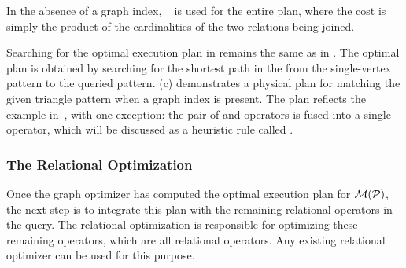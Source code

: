 In the absence of a graph index, \hashjoin~ is used for the entire plan, where the cost is simply the product of the cardinalities of the two relations being joined.


 Searching for the optimal execution plan in \name remains the same as in \glogs. The optimal plan is obtained by searching for the shortest path in the \glogue from the single-vertex pattern to the queried pattern.  %
(c) demonstrates a physical plan for matching the given triangle pattern when a graph index is present. The plan reflects the example in~, with one exception: the pair of \expandedge and \getvertex operators is fused into a single \expand operator, which will be discussed as a heuristic rule called \joinfuserule.


\subsubsection{The Relational Optimization}
Once the graph optimizer has computed the optimal execution plan for $\mathcal{M}(\mathcal{P})$, the next step is to integrate this plan with the remaining relational operators in the \spjm query. The relational optimization is responsible for optimizing these remaining operators, which are all relational operators. Any existing relational optimizer can be used for this purpose.


